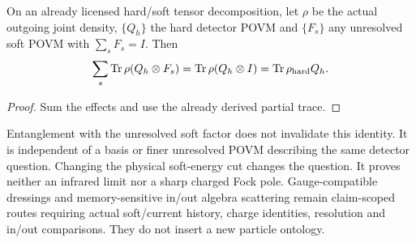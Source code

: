 \documentclass[12pt,a4paper]{article}
\begin{document}
\begin{corollary}
\label{p4:cor:v2210-lit-inclusive-soft}
On an already licensed hard/soft tensor decomposition, let $\rho$ be the
actual outgoing joint density, $\{Q_h\}$ the hard detector POVM and
$\{F_s\}$ any unresolved soft POVM with $\sum_sF_s=I$. Then
\[
 \sum_s\operatorname{Tr}\rho(Q_h\otimes F_s)
 =\operatorname{Tr}\rho(Q_h\otimes I)
 =\operatorname{Tr}\rho_{\rm hard}Q_h.
\]
\end{corollary}
\begin{proof}
Sum the effects and use the already derived partial trace.
\end{proof}
Entanglement with the unresolved soft factor does not invalidate this
identity. It is independent of a basis or finer unresolved POVM describing
the same detector question. Changing the physical soft-energy cut changes
the question. It proves neither an infrared limit nor a sharp charged
Fock pole. Gauge-compatible dressings and memory-sensitive in/out algebra
scattering \cite{LitQFTHiraiSugishita2021,LitQFTPrabhuSatishchandran2024}
remain claim-scoped routes requiring actual soft/current history, charge
identities, resolution and in/out comparisons. They do not insert a new
particle ontology.
\end{document}
